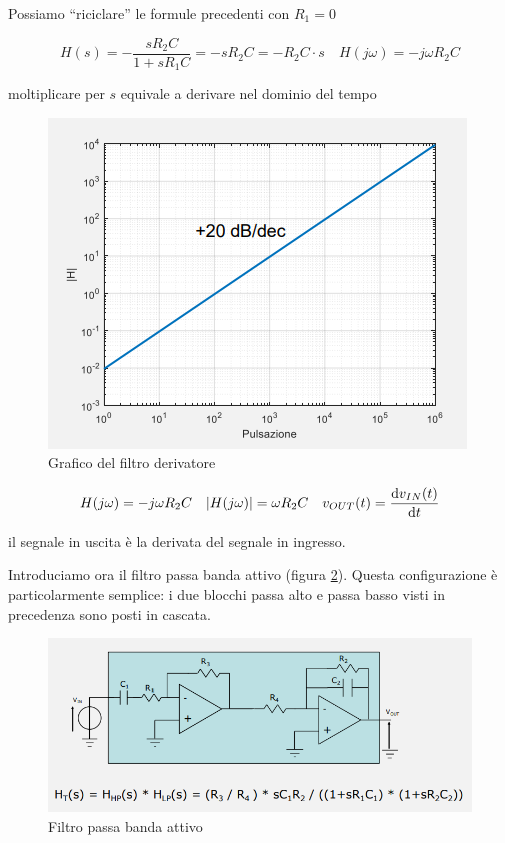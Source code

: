 \documentclass{article}
\begin{document}
Possiamo ``riciclare'' le formule precedenti con $R_1 = 0$

\[H(s) = - \frac{sR_2 C}{1 + sR_1 C} = - sR_2 C = - R_2 C \cdot s \quad H(j \omega) = - j \omega R_2 C\]

moltiplicare per $s$ equivale a derivare nel dominio del tempo

\begin{figure}[h]
  \centering
  \includegraphics[scale=0.6]{IM_filtro_derivatore_grafici}
  \caption{Grafico del filtro derivatore}
  \label{Schema_filtro_derivatore_grafici}
\end{figure}

\[H(j \omega) = - j \omega R_2 C \quad |H(j \omega)| = \omega R_2 C \quad v_{OUT} (t) = \frac{\textrm d v_{IN} (t)}{\textrm d t}\]

il segnale in uscita è la derivata del segnale in ingresso.


\clearpage
Introduciamo ora il filtro passa banda attivo (figura \ref{Schema_filtro_passa_banda_attivo}). Questa configurazione è particolarmente semplice: i due blocchi passa alto e passa basso visti in precedenza sono posti in cascata.

\begin{figure}[h]
  \centering
  \includegraphics[scale=0.7]{IM_filtro_passa_banda_attivo}
  \caption{Filtro passa banda attivo}
  \label{Schema_filtro_passa_banda_attivo}
\end{figure}
\end{document}
